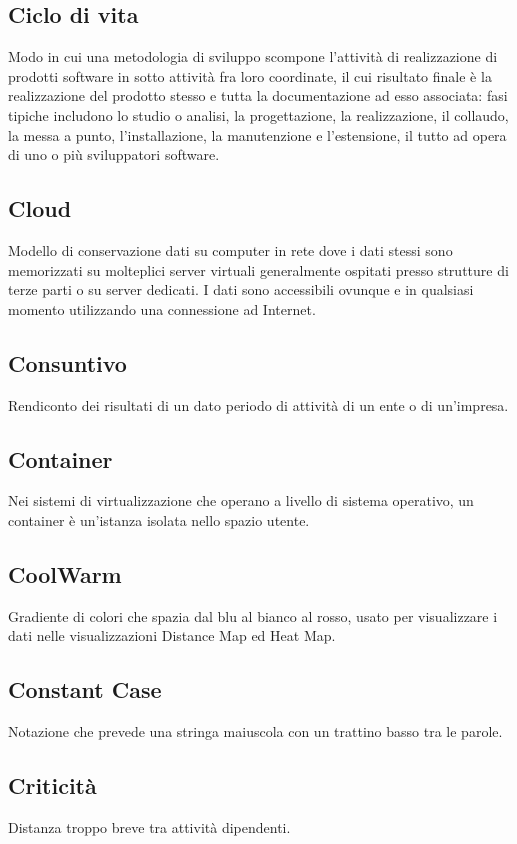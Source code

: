 \documentclass[../glossario.tex]{subfiles}
\begin{document}
\subsection*{Ciclo di vita}
{}
Modo in cui una metodologia di sviluppo scompone l'attività di realizzazione di prodotti software in sotto attività fra loro coordinate, il cui risultato finale è la realizzazione del prodotto stesso e tutta la documentazione ad esso associata: fasi tipiche includono lo studio o analisi, la progettazione, la realizzazione, il collaudo, la messa a punto, l'installazione, la manutenzione e l'estensione, il tutto ad opera di uno o più sviluppatori software.

\subsection*{Cloud}
{}
Modello di conservazione dati su computer in rete dove i dati stessi sono memorizzati su molteplici server virtuali generalmente ospitati presso strutture di terze parti o su server dedicati. I dati sono accessibili ovunque e in qualsiasi momento utilizzando una connessione ad Internet.

\subsection*{Consuntivo}
{}
Rendiconto dei risultati di un dato periodo di attività di un ente o di un'impresa.

\subsection*{Container}
{}
Nei sistemi di virtualizzazione che operano a livello di sistema operativo, un container è un’istanza isolata nello spazio utente.

\subsection*{CoolWarm}
{}
Gradiente di colori che spazia dal blu al bianco al rosso, usato per visualizzare i dati nelle visualizzazioni Distance Map ed Heat Map.

\subsection*{Constant Case}
{}
Notazione che prevede una stringa maiuscola con un trattino basso tra le parole.

\subsection*{Criticità}
{}
Distanza troppo breve tra attività dipendenti.
\end{document}
